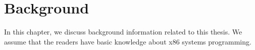 \chapter{Background}
\label{sec:background}

In this chapter, we discuss background information related to this thesis. We assume that the readers have basic knowledge about x86 systems programming.






